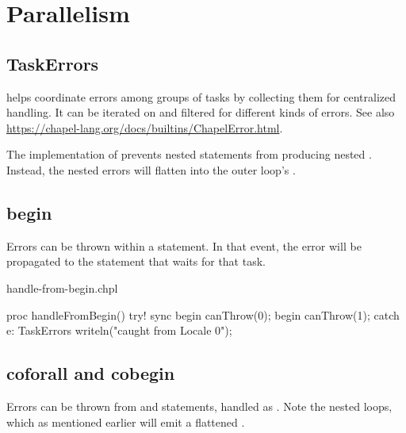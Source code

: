 \section{Parallelism}
\label{Errors_Parallelism}

\subsection{TaskErrors}
\label{TaskErrors}

 helps coordinate errors among groups of tasks by collecting
them for centralized handling. It can be iterated on and filtered for
different kinds of errors. See also
\url{https://chapel-lang.org/docs/builtins/ChapelError.html}.

The implementation of  prevents nested 
statements from producing nested . Instead, the nested
errors will flatten into the outer loop's .

\subsection{begin}
\label{Errors_begin}

Errors can be thrown within a  statement. In that event, the error
will be propagated to the  statement that waits for that task.

\begin{chapelexample}{handle-from-begin.chpl}
\begin{chapel}
proc handleFromBegin() {
  try! {
    sync {
      begin canThrow(0);
      begin canThrow(1);
    }
  } catch e: TaskErrors {
    writeln("caught from Locale 0");
  }
}
\end{chapel}
\begin{chapelpost}
\end{chapelpost}
\begin{chapeloutput}
\end{chapeloutput}
\end{chapelexample}

\subsection{coforall and cobegin}
\label{Errors_coforall_and_cobegin}

Errors can be thrown from  and  statements, handled
as . Note the nested  loops, which as mentioned
earlier will emit a flattened .

